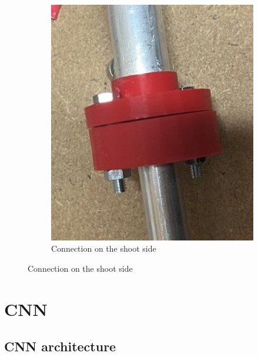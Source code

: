 \begin{figure}[H]
\begin{subfigure}{.5\textwidth}
        \includegraphics[width=0.9\linewidth]{../photos/connector_tube}
        \caption{Connection on the shoot side}
        \label{fig:connector_tube}
    \end{subfigure}
\end{figure}


\section{CNN}\label{sec:cnn}

\subsection{CNN architecture}\label{subsec:cnn-architecture}

